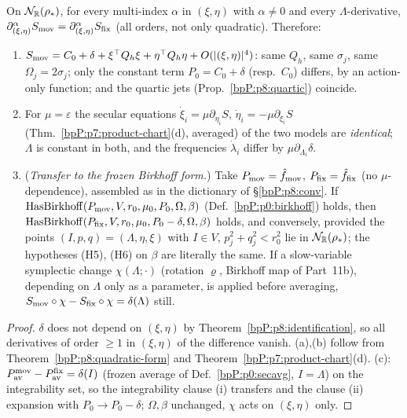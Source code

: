 \begin{corollary}\label{bpP:p8:same-jets}
On $\mathcal N_{\mathbb{R}}(\rho_*)$, for every multi-index $\alpha$ in $(\xi,\eta)$ with $\alpha\ne0$ and every $\Lambda$-derivative,
$\partial_{(\xi,\eta)}^\alpha S_{\rm mov}=\partial^\alpha_{(\xi,\eta)}S_{\rm fix}$ (all orders, not only quadratic). Therefore:
\begin{enumerate}[label=(\alph*)]
\item $S_{\rm mov}=C_0+\delta+\xi^\top Q_h\xi+\eta^\top Q_h\eta+O(|(\xi,\eta)|^4)$: same $Q_h$, same $\sigma_j$, same $\Omega_j=2\sigma_j$; only the constant term $P_0=C_0+\delta$ (resp.\ $C_0$) differs, by an action-only function; and the quartic jets (Prop.~\ref{bpP:p8:quartic}) coincide.
\item For $\mu=\varepsilon$ the secular equations $\dot\xi_i=\mu\partial_{\eta_i}S$, $\dot\eta_i=-\mu\partial_{\xi_i}S$ (Thm.~\ref{bpP:p7:product-chart}(d), averaged) of the two models are \emph{identical}; $\Lambda$ is constant in both, and the frequencies $\dot\lambda_i$ differ by $\mu\partial_{\Lambda_i}\delta$.
\item (\emph{Transfer to the frozen Birkhoff form.}) Take $P_{\rm mov}=\hat f_{\rm mov}$, $P_{\rm fix}=\hat f_{\rm fix}$ (no $\mu$-dependence), assembled as in the dictionary of \S\ref{bpP:p8:conv}. If $\operatorname{HasBirkhoff}(P_{\rm mov},V,r_0,\mu_0,P_0,\Omega,\beta)$ (Def.~\ref{bpP:p0:birkhoff}) holds, then $\operatorname{HasBirkhoff}(P_{\rm fix},V,r_0,\mu_0,P_0-\delta,\Omega,\beta)$ holds, and conversely, provided the points $(I,p,q)=(\Lambda,\eta,\xi)$ with $I\in V$, $p_j^2+q_j^2<r_0^2$ lie in $\mathcal N_{\mathbb{R}}(\rho_*)$; the hypotheses (H5), (H6) on $\beta$ are literally the same. If a slow-variable symplectic change $\chi(\Lambda;\cdot)$ (rotation $\varrho$, Birkhoff map of Part~11b), depending on $\Lambda$ only as a parameter, is applied before averaging, $S_{\rm mov}\circ\chi-S_{\rm fix}\circ\chi=\delta(\Lambda)$ still.
\end{enumerate}
\end{corollary}
\begin{proof}
$\delta$ does not depend on $(\xi,\eta)$ by Theorem~\ref{bpP:p8:identification}, so all derivatives of order $\ge1$ in $(\xi,\eta)$ of the difference vanish. (a),(b) follow from Theorem~\ref{bpP:p8:quadratic-form} and Theorem~\ref{bpP:p7:product-chart}(d). (c): $P_{\rm av}^{\rm mov}-P_{\rm av}^{\rm fix}=\delta(I)$ (frozen average of Def.~\ref{bpP:p0:secavg}, $I=\Lambda$) on the integrability set, so the integrability clause (i) transfers and the clause (ii) expansion with $P_0\to P_0-\delta$; $\Omega,\beta$ unchanged, $\chi$ acts on $(\xi,\eta)$ only.
\end{proof}
